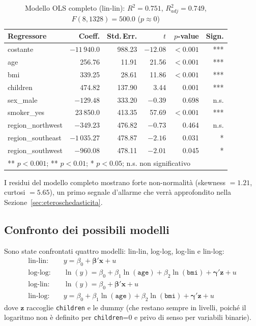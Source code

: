 \documentclass[11pt,a4paper]{article}
\begin{document}
\begin{table}[H]
\centering
\caption{Modello OLS completo (lin-lin): $R^2=0.751$, $R^2_{adj}=0.749$,
$F(8,1328)=500.0$ ($p\approx0$)}
\label{tab:modello_completo}
\begin{tabular}{lrrrrr}
\toprule
Regressore & Coeff. & Std.\,Err. & $t$ & $p$-value & Sign. \\
\midrule
costante           & $-11\,940.0$ & 988.23 & $-12.08$ & $<0.001$ & *** \\
age                & 256.76       & 11.91  & 21.56    & $<0.001$ & *** \\
bmi                & 339.25       & 28.61  & 11.86    & $<0.001$ & *** \\
children           & 474.82       & 137.90 & 3.44     & 0.001    & *** \\
sex\_male          & $-129.48$    & 333.20 & $-0.39$  & 0.698    & n.s. \\
smoker\_yes        & 23\,850.0    & 413.35 & 57.69    & $<0.001$ & *** \\
region\_northwest  & $-349.23$    & 476.82 & $-0.73$  & 0.464    & n.s. \\
region\_southeast  & $-1\,035.27$ & 478.87 & $-2.16$  & 0.031    & * \\
region\_southwest  & $-960.08$    & 478.11 & $-2.01$  & 0.045    & * \\
\bottomrule
\multicolumn{6}{l}{\footnotesize *** $p<0.001$; ** $p<0.01$; * $p<0.05$; n.s. non significativo}
\end{tabular}
\end{table}

I residui del modello completo mostrano forte non-normalità (skewness
$=1.21$, curtosi $=5.65$), un primo
segnale d'allarme che verrà approfondito nella Sezione~\ref{sec:eteroschedasticita}.

\subsection{Confronto dei possibili modelli}
Sono state confrontati quattro modelli: lin-lin, log-log, log-lin e
lin-log:
\begin{align}
\text{lin-lin:} \quad & y = \beta_0 + \boldsymbol{\beta}'\mathbf{x} + u \\
\text{log-log:} \quad & \ln(y) = \beta_0 + \beta_1\ln(\texttt{age}) + \beta_2\ln(\texttt{bmi}) + \boldsymbol{\gamma}'\mathbf{z} + u \\
\text{log-lin:} \quad & \ln(y) = \beta_0 + \boldsymbol{\beta}'\mathbf{x} + u \\
\text{lin-log:} \quad & y = \beta_0 + \beta_1\ln(\texttt{age}) + \beta_2\ln(\texttt{bmi}) + \boldsymbol{\gamma}'\mathbf{z} + u
\end{align}
dove $\mathbf{z}$ raccoglie \texttt{children} e le dummy (che restano sempre
in livelli, poiché il logaritmo non è definito per \texttt{children}=0 e
privo di senso per variabili binarie).
\end{document}

